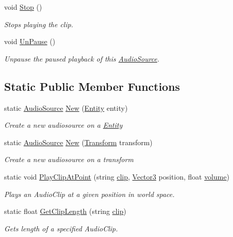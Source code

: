 \begin{DoxyCompactItemize}
void \mbox{\hyperlink{class_lua_1_1_audio_source_a3a622d080321f25beda52619d417dbce}{Stop}} ()
\begin{DoxyCompactList}\small\item\em Stops playing the clip. \end{DoxyCompactList}\item 
void \mbox{\hyperlink{class_lua_1_1_audio_source_a3bbbde9384f38a43f97e48cd162b0dac}{Un\+Pause}} ()
\begin{DoxyCompactList}\small\item\em Unpause the paused playback of this \mbox{\hyperlink{class_lua_1_1_audio_source}{Audio\+Source}}. \end{DoxyCompactList}\end{DoxyCompactItemize}
\subsection*{Static Public Member Functions}
\begin{DoxyCompactItemize}
\item 
static \mbox{\hyperlink{class_lua_1_1_audio_source}{Audio\+Source}} \mbox{\hyperlink{class_lua_1_1_audio_source_a9960981498216301c82794fa6a14d7ac}{New}} (\mbox{\hyperlink{class_lua_1_1_entity}{Entity}} entity)
\begin{DoxyCompactList}\small\item\em Create a new audiosource on a \mbox{\hyperlink{class_lua_1_1_entity}{Entity}} \end{DoxyCompactList}\item 
static \mbox{\hyperlink{class_lua_1_1_audio_source}{Audio\+Source}} \mbox{\hyperlink{class_lua_1_1_audio_source_a6b5a139f410004dd985f118c90dd5179}{New}} (\mbox{\hyperlink{class_lua_1_1_transform}{Transform}} transform)
\begin{DoxyCompactList}\small\item\em Create a new audiosource on a transform \end{DoxyCompactList}\item 
static void \mbox{\hyperlink{class_lua_1_1_audio_source_a132381c13acd88e5ef3e53e0e8c1ad66}{Play\+Clip\+At\+Point}} (string \mbox{\hyperlink{class_lua_1_1_audio_source_a4913b6f1fa8dfe5eb528cd7e40f91684}{clip}}, \mbox{\hyperlink{class_lua_1_1_vector3}{Vector3}} position, float \mbox{\hyperlink{class_lua_1_1_audio_source_a6e631df6c296491e5a29c8025878ddb4}{volume}})
\begin{DoxyCompactList}\small\item\em Plays an Audio\+Clip at a given position in world space. \end{DoxyCompactList}\item 
static float \mbox{\hyperlink{class_lua_1_1_audio_source_a7d14ab87ad493f85fa9ee1b747bf6df0}{Get\+Clip\+Length}} (string \mbox{\hyperlink{class_lua_1_1_audio_source_a4913b6f1fa8dfe5eb528cd7e40f91684}{clip}})
\begin{DoxyCompactList}\small\item\em Gets length of a specified Audio\+Clip. \end{DoxyCompactList}\end{DoxyCompactItemize}
